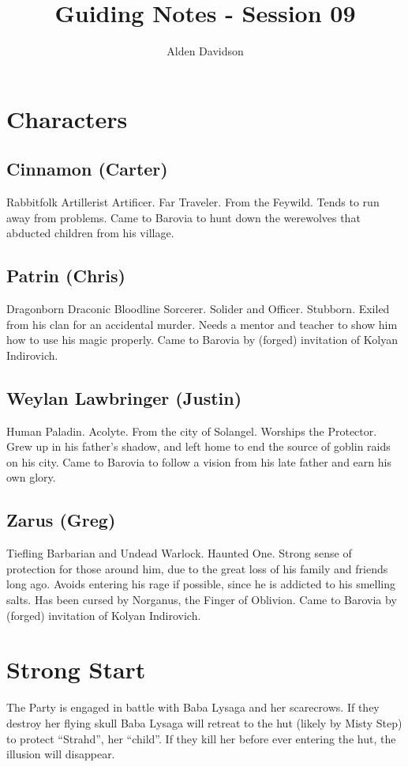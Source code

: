 \documentclass[a4paper,11pt]{article}
\title{Guiding Notes - Session 09}
\author{Alden Davidson}
\begin{document}
\maketitle
\tableofcontents

\pagebreak
\section{Characters}
\label{sec:Characters}
\subsection{Cinnamon (Carter)}
  Rabbitfolk Artillerist Artificer. Far Traveler. From the Feywild. Tends to run away from problems. Came to
  Barovia to hunt down the werewolves that abducted children from his village.
\subsection{Patrin (Chris)}
  Dragonborn Draconic Bloodline Sorcerer. Solider and Officer. Stubborn. Exiled from his clan for an accidental 
  murder. Needs a mentor and teacher to show him how to use his magic properly. Came to Barovia by (forged)
  invitation of Kolyan Indirovich.
\subsection{Weylan Lawbringer (Justin)}
  Human Paladin. Acolyte. From the city of Solangel. Worships the Protector. Grew up in his father's shadow, and 
  left home to end the source of goblin raids on his city. Came to Barovia to follow a vision from his late 
  father and earn his own glory.
\subsection{Zarus (Greg)}
  Tiefling Barbarian and Undead Warlock. Haunted One. Strong sense of protection for those around him, due to the
  great loss of his family and friends long ago. Avoids entering his rage if possible, since he is addicted to 
  his smelling salts. Has been cursed by Norganus, the Finger of Oblivion. Came to Barovia by (forged) 
  invitation of Kolyan Indirovich.


\pagebreak
\section{Strong Start}
\label{sec:StrongStart}
The Party is engaged in battle with Baba Lysaga and her scarecrows. If they destroy her flying skull Baba Lysaga 
will retreat to the hut (likely by Misty Step) to protect ``Strahd'', her ``child''. If they kill her before ever 
entering the hut, the illusion will disappear.
\end{document}
